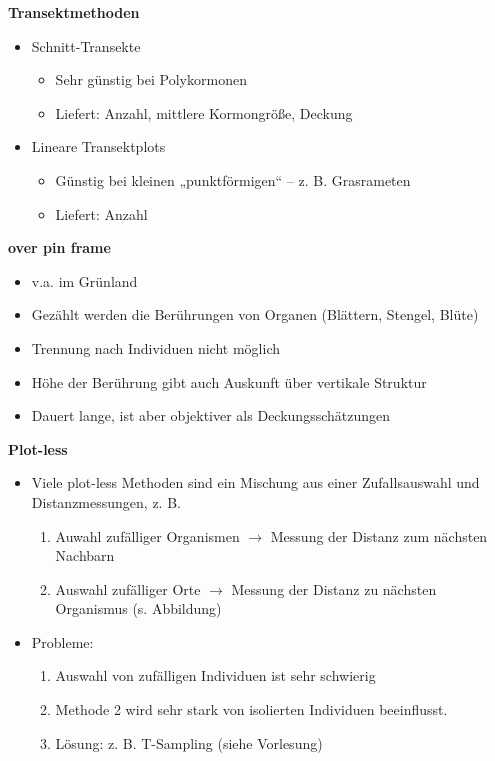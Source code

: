 \newpage
\textbf{Transektmethoden}
\begin{itemize}
	\item Schnitt-Transekte
	\begin{itemize}
		\item Sehr günstig bei Polykormonen
		\item Liefert: Anzahl, mittlere Kormongröße, Deckung
	\end{itemize}
	\item Lineare Transektplots
	\begin{itemize}
		\item Günstig bei kleinen „punktförmigen“ – z. B. Grasrameten
		\item Liefert: Anzahl
	\end{itemize}
\end{itemize}

\textbf{over pin frame}
\begin{itemize}
	\item v.a. im Grünland
	\item Gezählt werden die Berührungen von Organen (Blättern, Stengel, Blüte)
	\item Trennung nach Individuen nicht möglich
	\item Höhe der Berührung gibt auch Auskunft über vertikale Struktur
	\item Dauert lange, ist aber objektiver als Deckungsschätzungen
\end{itemize}

\textbf{Plot-less}
\begin{itemize}
	\item Viele plot-less Methoden sind ein Mischung aus einer Zufallsauswahl und Distanzmessungen, z. B.
	\begin{enumerate}
		\item Auwahl zufälliger Organismen $\rightarrow$ Messung der Distanz zum nächsten Nachbarn
		\item Auswahl zufälliger Orte $\rightarrow$ Messung der Distanz zu nächsten Organismus (s. Abbildung)
	\end{enumerate}
	\item Probleme:
	\begin{enumerate}
		\item Auswahl von zufälligen Individuen ist sehr schwierig
		\item Methode 2 wird sehr stark von isolierten Individuen beeinflusst.
		\item Lösung: z. B. T-Sampling (siehe Vorlesung)
	\end{enumerate}
\end{itemize}

